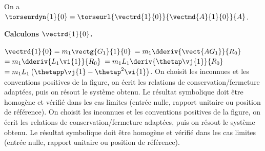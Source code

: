 \begin{corrigebox}
On a $\torseurdyn{1}{0} = \torseurl{\vectrd{1}{0}}{\vectmd{A}{1}{0}}{A}$.

\textbf{Calculons $\vectrd{1}{0}$.}

$\vectrd{1}{0} = m_1 \vectg{G_1}{1}{0}$ $=m_1\dderiv{\vect{AG_1}}{R_0}$
$=m_1\dderiv{L_1\vi{1}}{R_0}$
$=m_1L_1\deriv{\thetap\vj{1}}{R_0}$
$=m_1L_1\left( \thetapp \vj{1} - \thetap^2 \vi{1} \right)$.
On choisit les inconnues et les conventions positives de la figure,
        on écrit les relations de conservation/fermeture adaptées, puis on résout le
        système obtenu. Le résultat symbolique doit être homogène et vérifié dans les cas
        limites (entrée nulle, rapport unitaire ou position de référence).
On choisit les inconnues et les conventions positives de la figure,
        on écrit les relations de conservation/fermeture adaptées, puis on résout le
        système obtenu. Le résultat symbolique doit être homogène et vérifié dans les cas
        limites (entrée nulle, rapport unitaire ou position de référence).
\end{corrigebox}
